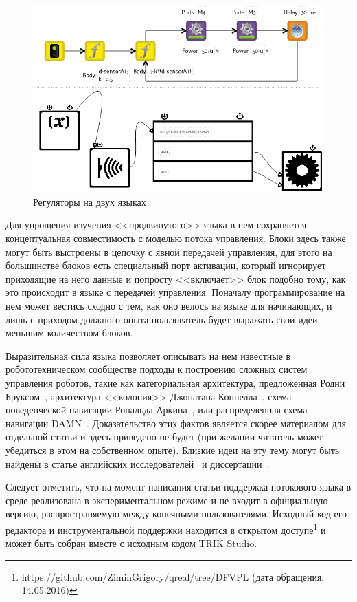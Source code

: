 \documentclass[conference]{IEEEtran}
\begin{document}
\begin{figure}[ht]
    \centering
    \includegraphics[width=\columnwidth]{TS_AlongTheBox_Comparison.png}
    \caption{Регуляторы на двух языках}
    \label{image:alongTheBox_CF_DF}
\end{figure}

Для упрощения изучения <<продвинутого>> языка в нем сохраняется концептуальная совместимость с моделью потока управления. Блоки здесь также могут быть выстроены в цепочку с явной передачей управления, для этого на большинстве блоков есть специальный порт активации, который игнорирует приходящие на него данные и попросту <<включает>> блок подобно тому, как это происходит в языке с передачей управления. Поначалу программирование на нем может вестись сходно с тем, как оно велось на языке для начинающих, и лишь с приходом должного опыта пользователь будет выражать свои идеи меньшим количеством блоков. 

Выразительная сила языка позволяет описывать на нем известные в робототехническом сообществе подходы к построению сложных систем управления роботов, такие как категориальная архитектура, предложенная Родни Бруксом~\cite{brooks1986robust}, архитектура <<колония>> Джонатана Коннелла~\cite{connell1989colony}, схема поведенческой навигации Рональда Аркина~\cite{arkin1987motor}, или распределенная схема навигации DAMN~\cite{rosenblatt1997damn}. Доказательство этих фактов является скорее материалом для отдельной статьи и здесь приведено не будет (при желании читатель может убедиться в этом на собственном опыте). Близкие идеи на эту тему могут быть найдены в статье английских исследователей~\cite{simpson2009toward} и диссертации~\cite{banyasad2000visual}.

Следует отметить, что на момент написания статьи поддержка потокового языка в среде реализована в экспериментальном режиме и не входит в официальную версию, распространяемую между конечными пользователями. Исходный код его редактора и инструментальной поддержки находится в открытом доступе\footnote{https://github.com/ZiminGrigory/qreal/tree/DFVPL (дата обращения: 14.05.2016)} и может быть собран вместе с исходным кодом TRIK Studio.
\end{document}
